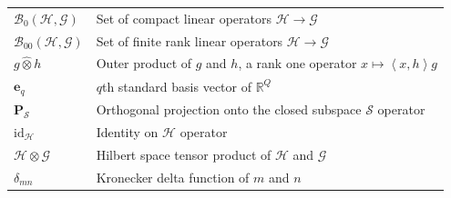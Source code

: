 \documentclass{article}
\numberwithin{theorem}{section}
\numberwithin{lemma}{section}
\numberwithin{definition}{section}
\numberwithin{assumption}{section}
\numberwithin{proposition}{section}
\numberwithin{remark}{section}
\numberwithin{corollary}{section}
\numberwithin{conjecture}{section}
\numberwithin{example}{section}
\newcommand{\R}{\mathbb{R}}
\newcommand{\aset}[1]{\left \langle #1 \right \rangle}
\newcommand{\id}{\mathrm{id}}
\begin{document}
\begin{multicols*}{2}
\begin{center}
\begin{tabular}{|C{4 em}|p{15 em}|}
	$\mathcal B_0(\mathcal H, \mathcal G)$ & Set of compact linear operators $\mathcal H \to \mathcal G$ \\
	$\mathcal B_{00}(\mathcal H, \mathcal G)$ & Set of finite rank linear operators $\mathcal H \to \mathcal G$ \\
	$g \widehat{\otimes} h$ & Outer product of $g$ and $h$, a rank one operator $x \mapsto \aset{x,h}g$ \\
	$\mathbf e_q$ & $q$th standard basis vector of $\R^Q$ \\
	$\mathbf P_\mathcal S$ & Orthogonal projection onto the closed subspace $\mathcal S$ operator \\
	$\id_\mathcal H$ & Identity on $\mathcal H$ operator \\
	$\mathcal H \otimes \mathcal G$ & Hilbert space tensor product of $\mathcal H$ and $\mathcal G$ \\
	$\delta_{mn}$ & Kronecker delta function of $m$ and $n$ \\
	\hline
\end{tabular}
\end{center}




\vspace{60pt}
\printbibliography
\end{multicols*}
\end{document}
